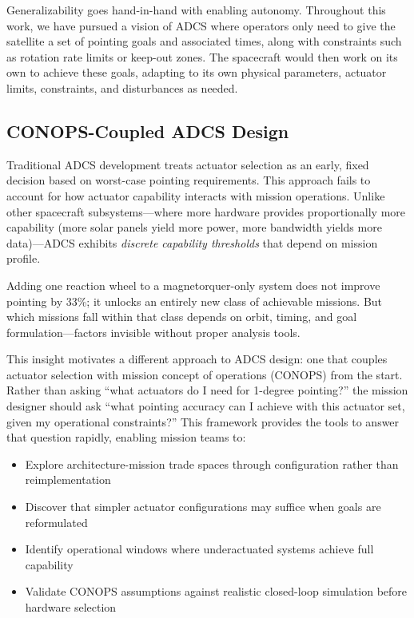 \documentclass[conference]{IEEEtran}
\begin{document}
Generalizability goes hand-in-hand with enabling autonomy. Throughout this work, we have pursued a vision of ADCS where operators only need to give the satellite a set of pointing goals and associated times, along with constraints such as rotation rate limits or keep-out zones. The spacecraft would then work on its own to achieve these goals, adapting to its own physical parameters, actuator limits, constraints, and disturbances as needed.

\subsection{CONOPS-Coupled ADCS Design}\label{subsec:conops}

Traditional ADCS development treats actuator selection as an early, fixed decision based on worst-case pointing requirements. This approach fails to account for how actuator capability interacts with mission operations. Unlike other spacecraft subsystems---where more hardware provides proportionally more capability (more solar panels yield more power, more bandwidth yields more data)---ADCS exhibits \emph{discrete capability thresholds} that depend on mission profile.

Adding one reaction wheel to a magnetorquer-only system does not improve pointing by 33\%; it unlocks an entirely new class of achievable missions. But which missions fall within that class depends on orbit, timing, and goal formulation---factors invisible without proper analysis tools.

This insight motivates a different approach to ADCS design: one that couples actuator selection with mission concept of operations (CONOPS) from the start. Rather than asking ``what actuators do I need for 1-degree pointing?'' the mission designer should ask ``what pointing accuracy can I achieve with this actuator set, given my operational constraints?'' This framework provides the tools to answer that question rapidly, enabling mission teams to:

\begin{itemize}
    \item Explore architecture-mission trade spaces through configuration rather than reimplementation
    \item Discover that simpler actuator configurations may suffice when goals are reformulated
    \item Identify operational windows where underactuated systems achieve full capability
    \item Validate CONOPS assumptions against realistic closed-loop simulation before hardware selection
\end{itemize}
\end{document}

